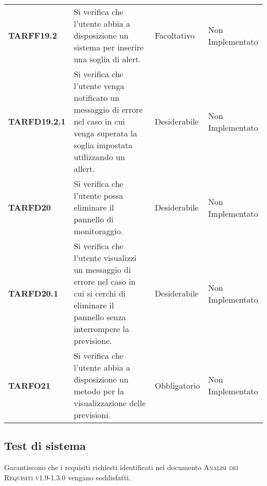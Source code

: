 \documentclass[../piano-di-qualifica.tex]{subfiles}
\begin{document}
\begin{longtable}[H]{>{\centering\bfseries}m{2.5cm} >{\centering}m{7.5cm} >{\centering}m{2.5cm} >{\centering\arraybackslash}m{3.5cm}}
  \textbf{TARFF19.2} & Si verifica che l'utente abbia a disposizione un sistema per inserire una soglia di alert. & Facoltativo & Non Implementato \\
  \textbf{TARFD19.2.1} & Si verifica che l'utente venga notificato un messaggio di errore nel caso in cui venga superata la soglia impostata utilizzando un allert. & Desiderabile & Non Implementato \\
  \textbf{TARFD20} & Si verifica che l'utente possa eliminare il pannello di monitoraggio. & Desiderabile & Non Implementato \\
  \textbf{TARFD20.1} & Si verifica che l'utente visualizzi un messaggio di errore nel caso in cui si cerchi di eliminare il pannello senza interrompere la previsione. & Desiderabile & Non Implementato \\
  \textbf{TARFO21} & Si verifica che l'utente abbia a disposizione un metodo per la visualizzazione delle previsioni. & Obbligatorio & Non Implementato \\
\end{longtable}




\subsection{Test di sistema}
\label{sub:test_di_sistema}
Garantiscono che i requisiti richiesti identificati nel documento \textsc{Analisi dei Requisiti v1.9-1.3.0} vengano soddisfatti.
\end{document}
